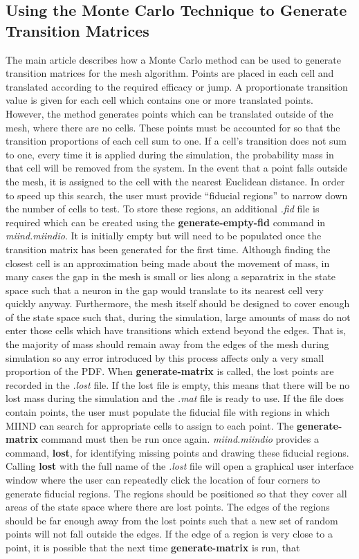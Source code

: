 \documentclass[utf8]{frontiers_suppmat} %
\begin{document}
\subsection{Using the Monte Carlo Technique to Generate Transition Matrices}
\label{suppl:montecarlo}
The main article describes how a Monte Carlo method can be used to generate transition matrices for the mesh algorithm. Points are placed in each cell and translated according to the required efficacy or jump. A proportionate transition value is given for each cell which contains one or more translated points. However, the method generates points which can be translated outside of the mesh, where there are no cells. These points must be accounted for so that the transition proportions of each cell sum to one. If a cell's transition does not sum to one, every time it is applied during the simulation, the probability mass in that cell will be removed from the system. In the event that a point falls outside the mesh, it is assigned to the cell with the nearest Euclidean distance. In order to speed up this search, the user must provide ``fiducial regions'' to narrow down the number of cells to test. To store these regions, an additional \textit{.fid} file is required which can be created using the \textbf{generate-empty-fid} command in \textit{miind.miindio}. It is initially empty but will need to be populated once the transition matrix has been generated for the first time. Although finding the closest cell is an approximation being made about the movement of mass, in many cases the gap in the mesh is small or lies along a separatrix in the state space such that a neuron in the gap would translate to its nearest cell very quickly anyway. Furthermore, the mesh itself should be designed to cover enough of the state space such that, during the simulation, large amounts of mass do not enter those cells which have transitions which extend beyond the edges. That is, the majority of mass should remain away from the edges of the mesh during simulation so any error introduced by this process affects only a very small proportion of the PDF. When \textbf{generate-matrix} is called, the lost points are recorded in the \textit{.lost} file. If the lost file is empty, this means that there will be no lost mass during the simulation and the \textit{.mat} file is ready to use. If the file does contain points, the user must populate the fiducial file with regions in which MIIND can search for appropriate cells to assign to each point. The \textbf{generate-matrix} command must then be run once again. \textit{miind.miindio} provides a command, \textbf{lost}, for identifying missing points and drawing these fiducial regions. Calling \textbf{lost} with the full name of the \textit{.lost} file will open a graphical user interface window where the user can repeatedly click the location of four corners to generate fiducial regions. The regions should be positioned so that they cover all areas of the state space where there are lost points. The edges of the regions should be far enough away from the lost points such that a new set of random points will not fall outside the edges. If the edge of a region is very close to a point, it is possible that the next time \textbf{generate-matrix} is run, that 
\end{document}

